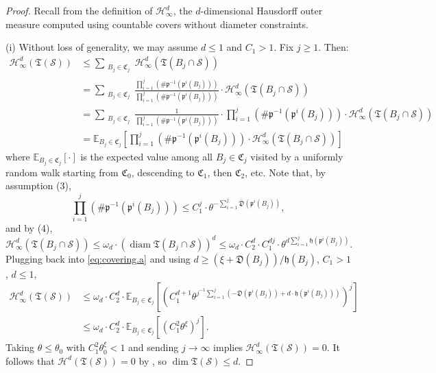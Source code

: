 \documentclass[11pt, letterpaper, reqno]{amsart}
\numberwithin{equation}{section}
\theoremstyle{remark}
\newcommand{\cH}{\mathcal{H}}
\newcommand{\cS}{\mathcal{S}}
\newcommand{\frT}{\mathfrak{T}}
\begin{document}
\begin{proof}
	Recall from \cite[\S 2]{Simon:GMT} the definition of $\cH^d_\infty$, the $d$-dimensional Hausdorff outer measure computed using countable covers without diameter constraints. 
	
	(i) Without loss of generality, we may assume $d \leq 1$ and $C_1 > 1$. Fix $j \geq 1$. Then:
	\begin{align} \label{eq:covering.a}
		\cH^d_\infty(\frT(\cS))
			& \leq \sum_{\substack{B_j \in \mathfrak{C}_j}} \cH^d_\infty(\frT(B_j \cap \cS)) \nonumber \\
			& = \sum_{\substack{B_j \in \mathfrak{C}_j}} \frac{\prod_{i=1}^j (\# \mathfrak{p}^{-1}(\mathfrak{p}^i(B_j)))}{\prod_{i=1}^j (\# \mathfrak{p}^{-1}(\mathfrak{p}^i(B_j)))} \cdot \cH^d_\infty(\frT(B_j \cap \cS)) \nonumber \\
			& = \sum_{\substack{B_j \in \mathfrak{C}_j}} \frac{1}{\prod_{i=1}^j (\# \mathfrak{p}^{-1}(\mathfrak{p}^i(B_j)))} \cdot \prod_{i=1}^j (\# \mathfrak{p}^{-1}(\mathfrak{p}^i(B_j))) \cdot \cH^d_\infty(\frT(B_j \cap \cS)) \nonumber \\
			& = \mathbb{E}_{B_j \in \mathfrak{C}_j} \left[ \prod_{i=1}^j (\# \mathfrak{p}^{-1}(\mathfrak{p}^i(B_j))) \cdot \cH^{d}_\infty(\frT(B_j \cap \cS)) \right]
	\end{align}
	where $\mathbb{E}_{B_j \in \mathfrak{C}_j}[\cdot]$ is the expected value among all $B_j \in \mathfrak{C}_j$ visited by a uniformly random walk starting from $\mathfrak{C}_0$, descending to $\mathfrak{C}_1$, then $\mathfrak{C}_2$, etc. Note that, by assumption (3),
	\[ \prod_{i=1}^j (\# \mathfrak{p}^{-1}(\mathfrak{p}^i(B_j))) \leq C_1^j \cdot \theta^{-\sum_{i=1}^j \mathfrak{D}(\mathfrak{p}^i(B_j))}, \]
	and by (4),
	\[ \cH^d_{\infty}(\frT(B_j \cap \cS)) \leq \omega_d \cdot (\operatorname{diam} \frT(B_j \cap \cS))^d \leq \omega_d \cdot C_2^d \cdot C_1^{dj} \cdot \theta^{d \sum_{i=1}^j \mathfrak{h}(\mathfrak{p}^i(B_j))}. \]
	Plugging back into \eqref{eq:covering.a} and using $d \geq (\xi + \mathfrak{D}(B_j))/\mathfrak{h}(B_j)$, $C_1 > 1$, $d \leq 1$,
	\begin{align*}
		\cH^d_\infty(\frT(\cS)) 
			& \leq \omega_d \cdot C_2^d \cdot \mathbb{E}_{B_j \in \mathfrak{C}_j} \left[ \left( C_1^{d+1} \theta^{j^{-1} \sum_{i=1}^j (-\mathfrak{D}(\mathfrak{p}^i(B_j)) + d \cdot \mathfrak{h}(\mathfrak{p}^i(B_j)))} \right)^j \right] \\
			& \leq \omega_d \cdot C_2^d \cdot \mathbb{E}_{B_j \in \mathfrak{C}_j} \left[ \left( C_1^2 \theta^{\xi} \right)^j \right].
	\end{align*}
	Taking $\theta \leq \theta_0$ with $C_1^{2} \theta_0^\xi < 1$ and sending $j \to \infty$ implies $\cH^d_\infty(\frT(\cS)) = 0$. It follows that $\cH^d(\frT(\cS)) = 0$ by \cite[Theorem 3.6]{Simon:GMT}, so $\dim \frT(\cS) \leq d$.
	

\end{proof}
\end{document}
